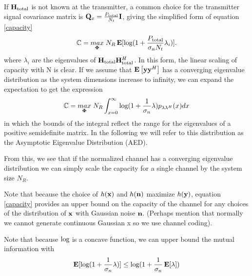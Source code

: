 If $\mathbf{H}_\text{total}$ is not known at the transmitter, a common choice for the transmitter signal covariance matrix is  $\mathbf{Q}_x = \frac{P_{\text{total}}}{N_t}\mathbf{I}$, giving the simplified form of equation \eqref{capacity}
\begin{equation}\label{no_csi_capacity}
\mathbb{C} = \underset{\boldsymbol{\Phi}}{\mathop{max}} \; N_R \mathop{\bf E{}}[\text{log{}}(1 + \frac{P_{\text{total}}}{\sigma_nN_t}\lambda_i)].
\end{equation}
where $\lambda_i$ are the eigenvalues of $\mathbf{H}_\text{total} \mathbf{H}_\text{total}^H$.
In this form, the linear scaling of capacity with N is clear.
If we assume that $\mathop{\bf E{}}\left[ \mathbf{y} \mathbf{y}^H \right]$ has a converging eigenvalue distribution as the system dimensions increase to infinity, we can expand the expectation to get the expression
\begin{equation}\label{no_csi_capacity_aed}
\mathbb{C} = \underset{\boldsymbol{\Phi}}{\mathop{max}} \; N_R  \int_{x=0}^{\infty}\text{log{}}(1 + \frac{1}{\sigma_n}\lambda)p_{\lambda\lambda^H}(x) dx
\end{equation}
in which the bounds of the integral reflect the range for the eigenvalues of a positive semidefinite matrix. In the following we will refer to this distribution as the Asymptotic Eigenvalue Distribution (AED).

From this, we see that if the normalized channel has a converging eigenvalue distribution we can simply scale the capacity for a single channel by the system size $N_R$. 

Note that because the choice of $h(\mathbf{x}) $ and $h(\mathbf{n})$ maximize $h(\mathbf{y})$, equation \eqref{capacity} provides an upper bound on the capacity of the channel for any choices of the distribution of $\mathbf{x} $ with Gaussian noise $\mathbf{n}$. (Perhaps mention that normally we cannot generate continuous Gaussian x so we use channel coding).


Note that because $\text{log{}}$ is a concave function, we can upper bound the mutual information with
\begin{equation}\label{mut_inf}
\mathop{\bf E{}}[\text{log{}}(1 + \frac{1}{\sigma_n}\lambda)] \leq \text{log{}}(1 + \frac{1}{\sigma_n}\mathop{\bf E{}}[\lambda])
\end{equation}